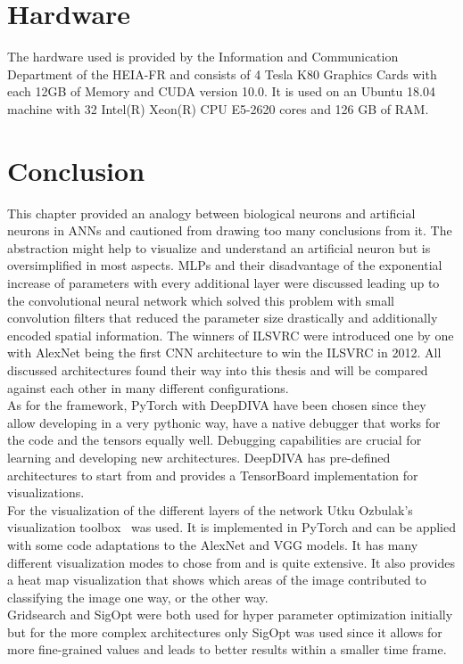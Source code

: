 \section{Hardware}

The hardware used is provided by the Information and Communication Department of the HEIA-FR and consists of 4 Tesla K80 Graphics Cards with each 12GB of Memory and CUDA version 10.0. It is used on an Ubuntu 18.04 machine with 32 Intel(R) Xeon(R) CPU E5-2620 cores and 126 GB of RAM.\\


\section{Conclusion}

This chapter provided an analogy between biological neurons and artificial neurons in ANNs and cautioned from drawing too many conclusions from it. The abstraction might help to visualize and understand an artificial neuron but is oversimplified in most aspects. MLPs and their disadvantage of the exponential increase of parameters with every additional layer were discussed leading up to the convolutional neural network which solved this problem with small convolution filters that reduced the parameter size drastically and additionally encoded spatial information. The winners of ILSVRC were introduced one by one with AlexNet being the first CNN architecture to win the ILSVRC in 2012. All discussed architectures found their way into this thesis and will be compared against each other in many different configurations. \\

As for the framework, PyTorch with DeepDIVA have been chosen since they allow developing in a very pythonic way, have a native debugger that works for the code and the tensors equally well. Debugging capabilities are crucial for learning and developing new architectures. DeepDIVA has pre-defined architectures to start from and provides a TensorBoard implementation for visualizations. \\

For the visualization of the different layers of the network Utku Ozbulak's visualization toolbox~\cite{viztoolbox} was used. It is implemented in PyTorch and can be applied with some code adaptations to the AlexNet and VGG models. It has many different visualization modes to chose from and is quite extensive. It also provides a heat map visualization that shows which areas of the image contributed to classifying the image one way, or the other way.\\

Gridsearch and SigOpt were both used for hyper parameter optimization initially but for the more complex architectures only SigOpt was used since it allows for more fine-grained values and leads to better results within a smaller time frame. \\